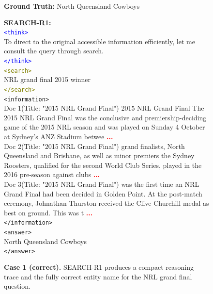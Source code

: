 \begin{figure}[ht]
\centering
\begin{tcolorbox}[
  colback=white,
  colframe=black!60,
  title=\textbf{Question:} Who won the NRL grand final in 2015?
]
\textbf{Ground Truth:} North Queensland Cowboys

\vspace{0.5em}
\textbf{SEARCH-R1:}\\
\textcolor{blue}{\texttt{<think>}}\\
To direct to the original accessible information efficiently, let me consult the query through search.\\
\textcolor{blue}{\texttt{</think>}}\\[0.7em]
\textcolor{olive}{\texttt{<search>}}\\
NRL grand final 2015 winner\\
\textcolor{olive}{\texttt{</search>}}\\[0.7em]
\textcolor{teal!60!black}{\texttt{<information>}}\\
Doc 1(Title: "2015 NRL Grand Final") 2015 NRL Grand Final The 2015 NRL Grand Final was the conclusive and premiership-deciding game of the 2015 NRL season and was played on Sunday 4 October at Sydney's ANZ Stadium betwee \textcolor{red}{\textbf{...}} \\
Doc 2(Title: "2015 NRL Grand Final") grand finalists, North Queensland and Brisbane, as well as minor premiers the Sydney Roosters, qualified for the second World Club Series, played in the 2016 pre-season against clubs \textcolor{red}{\textbf{...}} \\
Doc 3(Title: "2015 NRL Grand Final") was the first time an NRL Grand Final had been decided in Golden Point. At the post-match ceremony, Johnathan Thurston received the Clive Churchill medal as best on ground. This was t \textcolor{red}{\textbf{...}}\\
\textcolor{teal!60!black}{\texttt{</information>}}\\[0.7em]
\textcolor{magenta!70!black}{\texttt{<answer>}}\\
North Queensland Cowboys\\
\textcolor{magenta!70!black}{\texttt{</answer>}}\\[0.7em]
\end{tcolorbox}
\caption{\textbf{Case 1 (correct).} SEARCH-R1 produces a compact reasoning trace and the fully correct entity name for the NRL grand final question.}
\label{fig:nrl-correct}
\end{figure}


